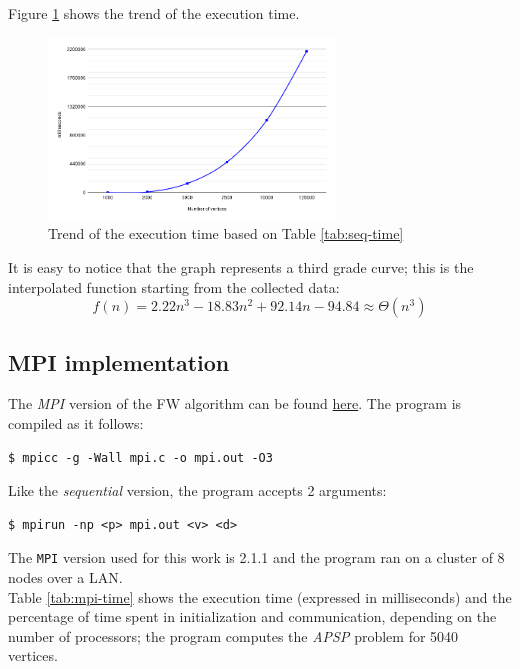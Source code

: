 Figure \ref*{fig:seq-time} shows the trend of the execution time. 

\begin{figure}[h!]
\centering                                                                        
\includegraphics[width=3in]{images/seq-time}
\captionsetup{justification=centering,margin=2cm}                                                                                                                                   
\caption{Trend of the execution time based on Table \ref*{tab:seq-time}}                                                                                                                                            
\label{fig:seq-time}                                                                                                                                                           
\end{figure}


It is easy to notice that the graph represents a 
third grade curve; this is the interpolated function starting from the collected data:
\[f(n) = 2.22n^3 - 18.83n^2 + 92.14n -94.84 \approx \Theta(n^3) \]



\subsection{MPI implementation}

The \emph{MPI} version of the FW algorithm can be found \href{https://github.com/firaja/Parallel-FloydWarshall/blob/master/mpi.c}{here}. 
The program is compiled as it follows:

\begin{lstlisting}[basicstyle=\footnotesize\ttfamily]
$ mpicc -g -Wall mpi.c -o mpi.out -O3
\end{lstlisting}
Like the \emph{sequential} version, the program accepts 2 arguments:
\begin{lstlisting}[basicstyle=\footnotesize\ttfamily]
$ mpirun -np <p> mpi.out <v> <d>
\end{lstlisting}
The \texttt{MPI} version used for this work is 2.1.1 and the program ran on a cluster of 8 nodes over a LAN. \\
Table \ref*{tab:mpi-time} shows the execution time (expressed in milliseconds) and the percentage of time spent in initialization and communication, depending on the number of processors; 
the program computes the \emph{APSP} problem for 5040 vertices.

